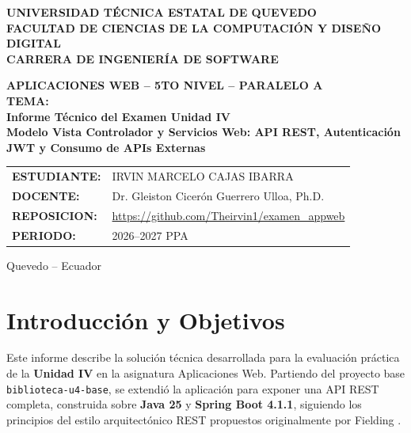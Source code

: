 \documentclass[11pt,a4paper]{article}
\begin{document}
\begin{titlepage}
  \centering
  \vspace*{0.5cm}
  {\Large \textbf{UNIVERSIDAD TÉCNICA ESTATAL DE QUEVEDO}}\\[0.3cm]
  {\large \textbf{FACULTAD DE CIENCIAS DE LA COMPUTACIÓN Y DISEÑO DIGITAL}}\\[0.2cm]
  {\large \textbf{CARRERA DE INGENIERÍA DE SOFTWARE}}

  \vspace{1.0cm}

  {\small \textbf{APLICACIONES WEB  -- 5TO NIVEL -- PARALELO A}}\\[0.3cm]

  {\small \textbf{TEMA:}}\\[0.3cm]
  {\LARGE \textbf{Informe Técnico del Examen Unidad IV}}\\[0.2cm]
  {\large \textbf{Modelo Vista Controlador y Servicios Web: API REST, Autenticación JWT y Consumo de APIs Externas}}

  \vspace{1.2cm}

  \begin{tabular}{ll}
    \textbf{ESTUDIANTE:} & IRVIN MARCELO CAJAS IBARRA \\
    \textbf{DOCENTE:}    & Dr. Gleiston Cicerón Guerrero Ulloa, Ph.D. \\
    \textbf{REPOSICION:} & \url{https://github.com/Theirvin1/examen_appweb} \\
    \textbf{PERIODO:}    & 2026--2027 PPA
  \end{tabular}

  \vfill
  {\normalsize Quevedo -- Ecuador }
\end{titlepage}


\newpage

\section{Introducción y Objetivos}

Este informe describe la solución técnica desarrollada para la evaluación práctica de la \textbf{Unidad IV} en la asignatura Aplicaciones Web. Partiendo del proyecto base \texttt{biblioteca-u4-base}, se extendió la aplicación para exponer una API REST completa, construida sobre \textbf{Java 25} y \textbf{Spring Boot 4.1.1}, siguiendo los principios del estilo arquitectónico REST propuestos originalmente por Fielding \cite{fielding2002principled}.
\end{document}
